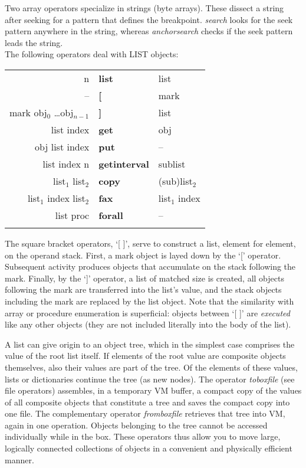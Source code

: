 Two array operators specialize in strings (byte arrays).  These dissect  a string after seeking for a pattern that defines the  breakpoint. \emph{search} looks for the seek pattern anywhere in the string, whereas \emph{anchorsearch} checks if the seek pattern leads the string.\\

\noindent The following operators deal with LIST objects:
\nopagebreak \\

\begin{tabular}{>{\sffamily}r>{\sffamily\bfseries}l>{\sffamily}l}
n & list & list\\
-- & [ & mark\\
mark obj$_0$ \ldots obj$_{n-1}$ & ] & list\\
list index & get & obj\\
obj list index & put & --\\
list index n & getinterval & sublist\\
list$_1$ list$_2$ & copy & (sub)list$_2$\\
list$_1$ index list$_2$ & fax & list$_1$ index\\
list proc & forall & --\\\\
\end{tabular}

The square bracket operators,  `[ ]', serve to construct a list, element for element,  on the operand stack.  First,  a mark object is layed down  by the `[' operator. Subsequent  activity  produces  objects  that  accumulate  on  the   stack following the mark.  Finally,  by the `]' operator, a list of matched size is created, all objects following the mark are transferred into the list's value,  and  the stack objects including the mark are replaced by the  list object.  Note  that the similarity with array or procedure enumeration  is superficial:  objects between `[ ]' are \emph{executed} like any other objects (they are not included literally into the body of the list).

A  list  can give origin to an object tree,  which in the  simplest  case comprises the value of the root list itself. If elements of the root value are composite objects themselves,  also their values are part  of the tree.  Of the elements of these values, lists or dictionaries continue the  tree (as new nodes). The operator \emph{toboxfile} (see file operators) assembles,  in a temporary VM buffer, a compact copy  of  the values of all composite objects that  constitute  a tree  and  saves the compact copy into one file.  The complementary operator \emph{fromboxfile} retrieves that tree into VM,  again in one operation. Objects belonging to the tree cannot be  accessed individually while in the box.  These operators  thus allow you to move large,  logically connected collections of objects in  a convenient and physically efficient manner.\\

